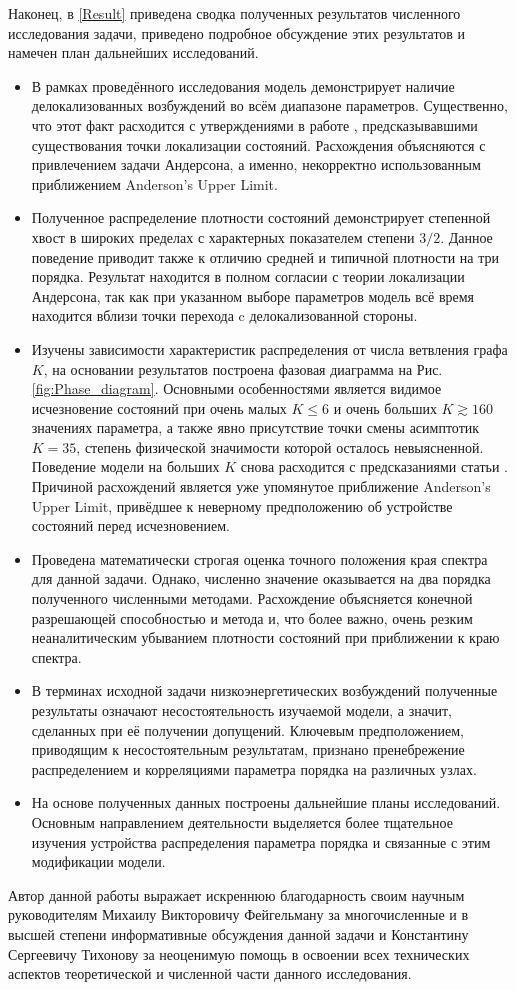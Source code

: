Наконец, в \autoref{Result} приведена сводка полученных результатов численного исследования задачи, приведено подробное обсуждение этих результатов и намечен план дальнейших исследований.
\begin{itemize}
	\item В рамках проведённого исследования модель демонстрирует наличие делокализованных возбуждений во всём диапазоне параметров. Существенно, что этот факт расходится с утверждениями в работе \cite{FI_microwave}, предсказывавшими существования точки локализации состояний. Расхождения объясняются с привлечением задачи Андерсона, а именно, некорректно использованным приближением Anderson's Upper Limit. 
	\item Полученное распределение плотности состояний демонстрирует степенной хвост в широких пределах с характерных показателем степени $3/2$. Данное поведение приводит также к отличию средней и типичной плотности на три порядка. Результат находится в полном согласии с теории локализации Андерсона, так как при указанном выборе параметров модель всё время находится вблизи точки перехода c делокализованной стороны.
	\item Изучены зависимости характеристик распределения от числа ветвления графа $K$, на основании результатов построена фазовая диаграмма на Рис. \ref{fig:Phase_diagram}. Основными особенностями является видимое исчезновение состояний при очень малых $K \le 6$ и очень больших $K \gtrsim 160$ значениях параметра, а также явно присутствие точки смены асимптотик $K = 35$, степень физической значимости которой осталось невыясненной. Поведение модели на больших $K$ снова расходится с предсказаниями статьи \cite{FI_microwave}. Причиной расхождений является уже упомянутое приближение Anderson's Upper Limit, привёдшее к неверному предположению об устройстве состояний перед исчезновением.
	\item Проведена математически строгая оценка точного положения края спектра для данной задачи. Однако, численно значение оказывается на два порядка полученного численными методами. Расхождение объясняется конечной разрешающей способностью и метода и, что более важно, очень резким неаналитическим убыванием плотности состояний при приближении к краю спектра.
	\item В терминах исходной задачи низкоэнергетических возбуждений полученные результаты означают несостоятельность изучаемой модели, а значит, сделанных при её получении допущений. Ключевым предположением, приводящим к несостоятельным результатам, признано пренебрежение распределением и корреляциями параметра порядка на различных узлах.
	\item На основе полученных данных построены дальнейшие планы исследований. Основным направлением деятельности выделяется более тщательное изучения устройства распределения параметра порядка и связанные с этим модификации модели.
\end{itemize}

Автор данной работы выражает искреннюю благодарность своим научным руководителям Михаилу Викторовичу Фейгельману за многочисленные и в высшей степени информативные обсуждения данной задачи и Константину Сергеевичу Тихонову за неоценимую помощь в освоении всех технических аспектов теоретической и численной части данного исследования.